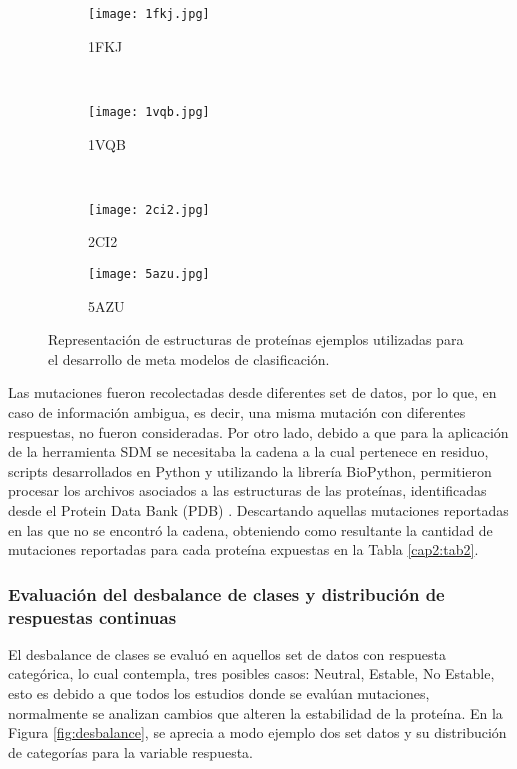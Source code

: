 \begin{figure}
	\centering
	\begin{subfigure}{0.4\textwidth}
		\texttt{[image: 1fkj.jpg]}
		\caption{1FKJ}
		\label{fig:1FKJ}
	\end{subfigure}
	~ %
	\begin{subfigure}{0.4\textwidth}
		\texttt{[image: 1vqb.jpg]}
		\caption{1VQB}
		\label{fig:1VQB}
	\end{subfigure}
	~ %
	\begin{subfigure}{0.4\textwidth}
		\texttt{[image: 2ci2.jpg]}
		\caption{2CI2}
		\label{fig:2CI2}
	\end{subfigure}
	
	\begin{subfigure}{0.4\textwidth}
		\texttt{[image: 5azu.jpg]}
		\caption{5AZU}
		\label{fig:5AZU}
	\end{subfigure}
	\caption{Representación de estructuras de proteínas ejemplos utilizadas para el desarrollo de meta modelos de clasificación.}
	\label{fig:proteins}
\end{figure}

Las mutaciones fueron recolectadas desde diferentes set de datos, por lo que, en caso de información ambigua, es decir, una misma mutación con diferentes respuestas, no fueron consideradas. Por otro lado, debido a que para la aplicación de la herramienta SDM se necesitaba la cadena a la cual pertenece en residuo, scripts desarrollados en Python y utilizando la librería BioPython, permitieron procesar los archivos asociados a las estructuras de las proteínas, identificadas desde el Protein Data Bank (PDB) \cite{abola1984protein}. Descartando aquellas mutaciones reportadas en las que no se encontró la cadena, obteniendo como resultante la cantidad de mutaciones reportadas para cada proteína expuestas en la Tabla \ref{cap2:tab2}.
 
\subsubsection{Evaluación del desbalance de clases y distribución de respuestas continuas}

El desbalance de clases se evaluó en aquellos set de datos con respuesta categórica, lo cual contempla, tres posibles casos: Neutral, Estable, No Estable, esto es debido a que todos los estudios donde se evalúan mutaciones, normalmente se analizan cambios que alteren la estabilidad de la proteína. En la Figura \ref{fig:desbalance}, se aprecia a modo ejemplo dos set datos y su distribución de categorías para la variable respuesta.

